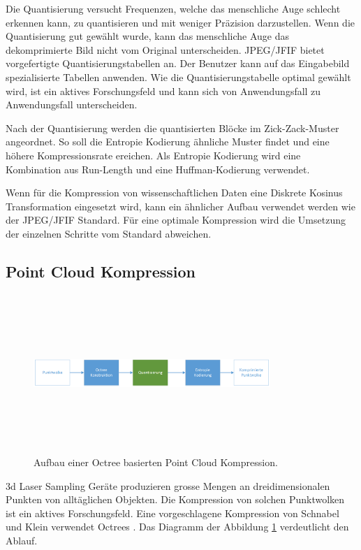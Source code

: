 Die Quantisierung versucht Frequenzen, welche das menschliche Auge schlecht erkennen kann, zu quantisieren und mit weniger Präzision darzustellen. Wenn die Quantisierung gut gewählt wurde, kann das menschliche Auge das dekomprimierte Bild nicht vom Original unterscheiden. JPEG/JFIF bietet vorgefertigte Quantisierungstabellen an. Der Benutzer kann auf das Eingabebild spezialisierte Tabellen anwenden. Wie die Quantisierungstabelle optimal gewählt wird, ist ein aktives Forschungsfeld \cite{wu1993rate:jpeg} \cite{wang2001designing:jpeg} und kann sich von Anwendungsfall zu Anwendungsfall unterscheiden.

Nach der Quantisierung werden die quantisierten Blöcke im Zick-Zack-Muster \cite{wallace1992jpeg} angeordnet. So soll die Entropie Kodierung ähnliche Muster findet und eine höhere Kompressionsrate ereichen. Als Entropie Kodierung wird eine Kombination aus Run-Length \cite{wiki:rle} und eine Huffman-Kodierung \cite{huffman1952method} verwendet.

Wenn für die Kompression von wissenschaftlichen Daten eine Diskrete Kosinus Transformation eingesetzt wird, kann ein ähnlicher Aufbau verwendet werden wie der JPEG/JFIF Standard. Für eine optimale Kompression wird die Umsetzung der einzelnen Schritte vom Standard abweichen.

\subsection{Point Cloud Kompression} \label{state:pointcloud}
\begin{figure}[!htbp]
	\center
	\includegraphics[width=0.8\textwidth,height=6cm,keepaspectratio]{./pictures/state/pointcloud.png}
	\caption{Aufbau einer Octree basierten Point Cloud Kompression.}
	\label{state:pointcloud:abb}
\end{figure}
3d Laser Sampling Geräte produzieren grosse Mengen an dreidimensionalen Punkten von alltäglichen Objekten. Die Kompression von solchen Punktwolken ist ein aktives Forschungsfeld. Eine vorgeschlagene Kompression  von Schnabel und Klein \cite{schnabel2006octree} verwendet Octrees \cite{wiki:octree}. Das Diagramm der Abbildung \ref{state:pointcloud:abb} verdeutlicht den Ablauf.

